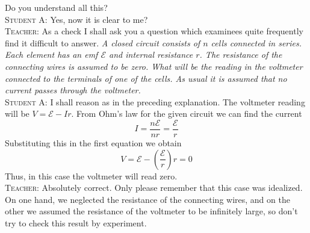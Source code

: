 \documentclass[a4paper,sfsidenotes]{tufte-book}
\newcommand{\Ea}{\mathcal{E}}
\begin{document}
Do you understand all this?
\\
\textsc{Student A:} Yes, now it is clear to me?
\\
\textsc{Teacher:}  As a check I shall ask you a question which examinees quite frequently find it difficult to answer. \emph{ A closed circuit consists of $n$ cells connected in series. Each element has an emf $\Ea$ and internal resistance $r$. The resistance of the connecting wires is assumed to be zero. What will be the reading in the voltmeter connected to the terminals of one of the cells. As usual it is assumed that no current passes through the voltmeter.}
\\
\textsc{Student A:} I shall reason as in the preceding explanation. The voltmeter reading will be $V = \Ea -Ir$. From Ohm's law for the given circuit we can find the current 
\begin{equation*}
I = \frac{n\Ea}{nr} = \frac{\Ea}{r} 
\end{equation*}
Substituting this in the first equation we obtain 
\begin{equation*}
V = \Ea - \left( \frac{\Ea}{r} \right)r = 0
\end{equation*}
Thus, in this case the voltmeter will read zero.
\\
\textsc{Teacher:} Absolutely correct. Only please remember that this case was idealized. On one hand, we neglected the resistance of the connecting wires, and on the other we assumed the resistance of the voltmeter to be infinitely large, so don't try to check this result by experiment.
\end{document}
